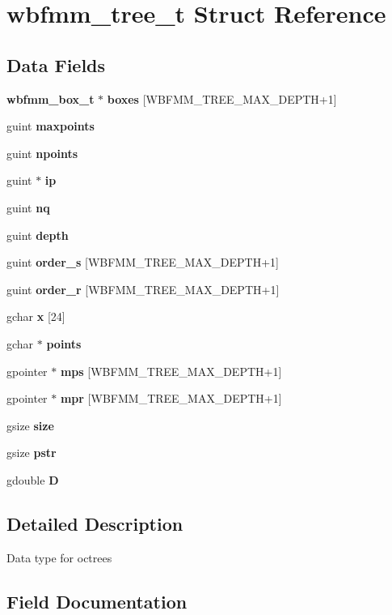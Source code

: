 \section{wbfmm\+\_\+tree\+\_\+t Struct Reference}
\label{structwbfmm__tree__t}
\subsection*{Data Fields}
\begin{DoxyCompactItemize}
\item 
{\bf wbfmm\+\_\+box\+\_\+t} $\ast$ {\bf boxes} [W\+B\+F\+M\+M\+\_\+\+T\+R\+E\+E\+\_\+\+M\+A\+X\+\_\+\+D\+E\+P\+T\+H+1]
\item 
guint {\bf maxpoints}
\item 
guint {\bf npoints}
\item 
guint $\ast$ {\bf ip}
\item 
guint {\bf nq}
\item 
guint {\bf depth}
\item 
guint {\bf order\+\_\+s} [W\+B\+F\+M\+M\+\_\+\+T\+R\+E\+E\+\_\+\+M\+A\+X\+\_\+\+D\+E\+P\+T\+H+1]
\item 
guint {\bf order\+\_\+r} [W\+B\+F\+M\+M\+\_\+\+T\+R\+E\+E\+\_\+\+M\+A\+X\+\_\+\+D\+E\+P\+T\+H+1]
\item 
gchar {\bf x} [24]
\item 
gchar $\ast$ {\bf points}
\item 
gpointer $\ast$ {\bf mps} [W\+B\+F\+M\+M\+\_\+\+T\+R\+E\+E\+\_\+\+M\+A\+X\+\_\+\+D\+E\+P\+T\+H+1]
\item 
gpointer $\ast$ {\bf mpr} [W\+B\+F\+M\+M\+\_\+\+T\+R\+E\+E\+\_\+\+M\+A\+X\+\_\+\+D\+E\+P\+T\+H+1]
\item 
gsize {\bf size}
\item 
gsize {\bf pstr}
\item 
gdouble {\bf D}
\end{DoxyCompactItemize}


\subsection{Detailed Description}
Data type for octrees 

\subsection{Field Documentation}
